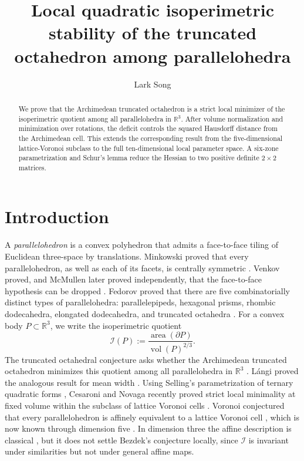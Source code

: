 \documentclass[11pt]{article}
\title{Local quadratic isoperimetric stability of the truncated octahedron among parallelohedra}
\author{Lark Song}
\date{}
\newcommand{\R}{\mathbb R}
\newcommand{\vol}{\operatorname{vol}}
\newcommand{\area}{\operatorname{area}}
\newcommand{\Ical}{\mathcal I}
\theoremstyle{remark}
\begin{document}
\maketitle

\begin{abstract}
We prove that the Archimedean truncated octahedron is a strict local minimizer of the isoperimetric quotient among all parallelohedra in $\R^3$.  After volume normalization and minimization over rotations, the deficit controls the squared Hausdorff distance from the Archimedean cell.  This extends the corresponding result from the five-dimensional lattice-Voronoi subclass to the full ten-dimensional local parameter space.  A six-zone parametrization and Schur's lemma reduce the Hessian to two positive definite $2\times2$ matrices.
\end{abstract}

\section{Introduction}

A \emph{parallelohedron} is a convex polyhedron that admits a face-to-face tiling of Euclidean three-space by translations.  
Minkowski proved that every parallelohedron, as well as each of its facets, is centrally symmetric \cite{Minkowski1897}.
Venkov proved, and McMullen later proved independently, that the face-to-face hypothesis can be dropped \cite{Venkov1954,McMullen1980}. 
Fedorov proved that there are five combinatorially distinct types of parallelohedra: parallelepipeds, hexagonal prisms, rhombic dodecahedra, elongated dodecahedra, and truncated octahedra \cite{Fedorov1885}. 
For a convex body $P\subset\R^3$, we write the isoperimetric quotient
\[
  \Ical(P):=\frac{\area(\partial P)}{\vol(P)^{2/3}}.
\]
The truncated octahedral conjecture asks whether the Archimedean truncated octahedron minimizes this quotient among all parallelohedra in $\R^3$ \cite[Conjecture~7.5]{Bezdek2006}.  
L\'angi proved the analogous result for mean width \cite{Langi2022}.  
Using Selling's parametrization of ternary quadratic forms \cite{Selling1874}, Cesaroni and Novaga recently proved strict local minimality at fixed volume within the subclass of lattice Voronoi cells \cite{CesaroniNovaga2026}. Voronoi conjectured that every parallelohedron is affinely equivalent to a lattice Voronoi cell \cite{Voronoi1908}, which is now known through dimension five \cite{Garber2025}. In dimension three the affine description is classical \cite{Langi2022}, but it does not settle Bezdek's conjecture locally, since $\Ical$ is invariant under similarities but not under general affine maps.
\end{document}
